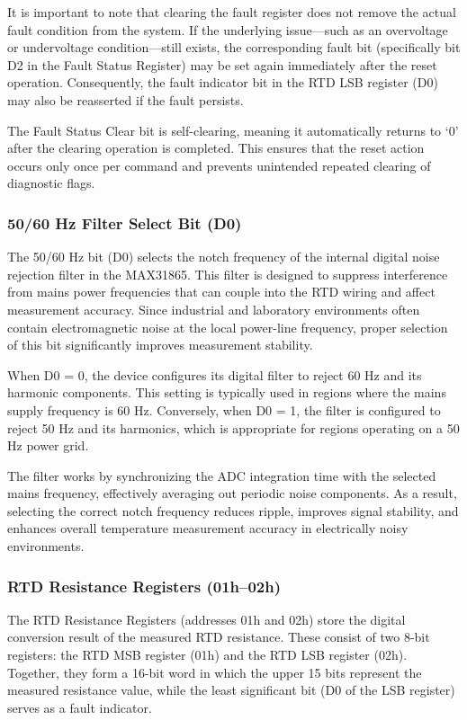 It is important to note that clearing the fault register does not remove the actual fault condition from the system. If the underlying issue—such as an overvoltage or undervoltage condition—still exists, the corresponding fault bit (specifically bit D2 in the Fault Status Register) may be set again immediately after the reset operation. Consequently, the fault indicator bit in the RTD LSB register (D0) may also be reasserted if the fault persists.

The Fault Status Clear bit is self-clearing, meaning it automatically returns to ‘0’ after the clearing operation is completed. This ensures that the reset action occurs only once per command and prevents unintended repeated clearing of diagnostic flags.

\subsubsection{50/60 Hz Filter Select Bit (D0)}
The 50/60 Hz bit (D0) selects the notch frequency of the internal digital noise rejection filter in the MAX31865. This filter is designed to suppress interference from mains power frequencies that can couple into the RTD wiring and affect measurement accuracy. Since industrial and laboratory environments often contain electromagnetic noise at the local power-line frequency, proper selection of this bit significantly improves measurement stability.

When D0 = 0, the device configures its digital filter to reject 60 Hz and its harmonic components. This setting is typically used in regions where the mains supply frequency is 60 Hz. Conversely, when D0 = 1, the filter is configured to reject 50 Hz and its harmonics, which is appropriate for regions operating on a 50 Hz power grid.

The filter works by synchronizing the ADC integration time with the selected mains frequency, effectively averaging out periodic noise components. As a result, selecting the correct notch frequency reduces ripple, improves signal stability, and enhances overall temperature measurement accuracy in electrically noisy environments.

\subsubsection{RTD Resistance Registers (01h–02h)}
The RTD Resistance Registers (addresses 01h and 02h) store the digital conversion result of the measured RTD resistance. These consist of two 8-bit registers: the RTD MSB register (01h) and the RTD LSB register (02h). Together, they form a 16-bit word in which the upper 15 bits represent the measured resistance value, while the least significant bit (D0 of the LSB register) serves as a fault indicator.

